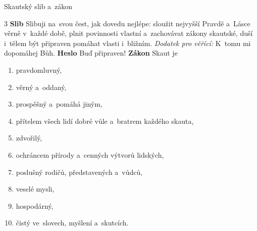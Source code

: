 \documentclass[compress, xelatex, 11pt, xcolor=dvipsnames, aspectratio=169, url={hyphens, lowtilde}]{beamer}
\begin{document}
\begin{frame}{Skautský slib a~zákon}
	\begin{multicols}{3}
		\vfill
		\textbf{Slib}
		\vfill
		Slibuji na~svou čest, jak dovedu nejlépe: sloužit nejvyšší Pravdě a~Lásce věrně v~každé době, plnit povinnosti vlastní a~zachovávat zákony skautské, duší i~tělem být připraven pomáhat vlasti i~bližním.
		\vfill
		\textit{Dodatek pro věřící:} K~tomu mi dopomáhej Bůh.
		\vfill
		\textbf{Heslo}
		\vfill
		Buď připraven!
		\vfill
		\textbf{Zákon}
		\vfill
		Skaut je
		\begin{enumerate}
			\item pravdomluvný,
			\item věrný a~oddaný,
			\item prospěšný a~pomáhá jiným,
			\item přítelem všech lidí dobré vůle a~bratrem každého skauta,
			\item zdvořilý,
			\item ochráncem přírody a~cenných výtvorů lidských,
			\item poslušný rodičů, představených a~vůdců,
			\item veselé mysli,
			\item hospodárný,
			\item čistý ve~slovech, myšlení a~skutcích.
		\end{enumerate}
	\end{multicols}
\end{frame}
\end{document}
